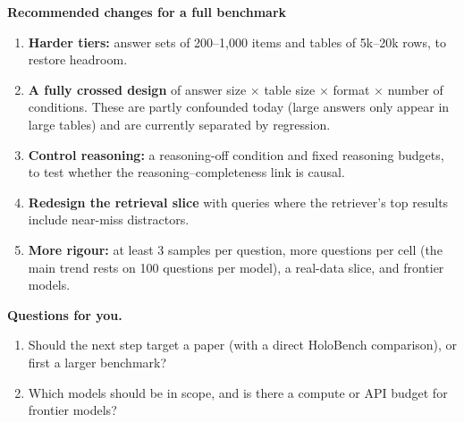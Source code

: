 \documentclass[10pt]{article}
\begin{document}
\textbf{Recommended changes for a full benchmark}
\begin{enumerate}
\item \textbf{Harder tiers:} answer sets of 200--1{,}000 items and tables of 5k--20k rows, to restore headroom.
\item \textbf{A fully crossed design} of answer size $\times$ table size $\times$ format $\times$ number of
conditions. These are partly
confounded today (large answers only appear in large tables) and are currently separated by regression.
\item \textbf{Control reasoning:} a reasoning-off condition and fixed reasoning budgets, to test whether the
reasoning--completeness link is causal.
\item \textbf{Redesign the retrieval slice} with queries where the retriever's top results include near-miss
distractors.
\item \textbf{More rigour:} at least 3 samples per question, more questions per cell (the main trend rests on 100
questions per model), a real-data slice, and frontier models.
\end{enumerate}

\textbf{Questions for you.}
\begin{enumerate}
\item Should the next step target a paper (with a direct HoloBench comparison), or first a larger benchmark?
\item Which models should be in scope, and is there a compute or API budget for frontier models?
\end{enumerate}
\end{document}

